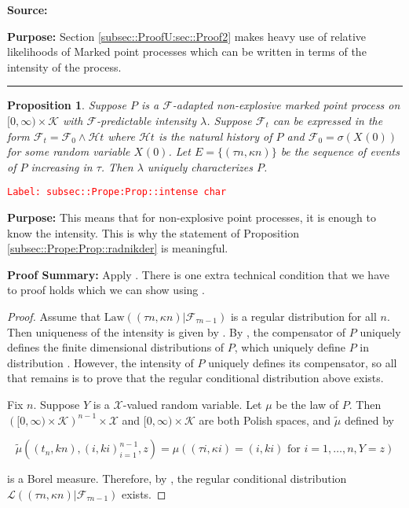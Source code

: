 \documentclass[12pt]{article}
\newcommand{\mc}{\mathcal}
\newcommand{\ms}{\mathscr}
\newcommand{\te}{\text}
\newcommand{\tr}{\textcolor{red}}
\newcommand{\labe}[1]{\tr{\texttt{Label: #1}}}
\newcommand{\purpose}{\textbf{Purpose: }}
\newcommand{\pfsum}{\textbf{Proof Summary: }}
\newcommand{\ind}{\hspace{24pt}}
\newcommand{\lin}{\rule{\linewidth}{0.4 pt}}
\renewcommand{\t}{t}							%
\newcommand{\F}{\mc{F}}							%
\newcommand{\FH}{\mc{H}}						%
\newcommand{\X}{X}								%
\newcommand{\cind}[1]{_{#1}}					%
\newcommand{\tp}[1]{(#1)}						%
\newcommand{\ts}[1]{_{#1}}						%
\newcommand{\rate}{\lambda}						%
\newcommand{\alt}[1]{\widetilde{#1}}			%
\newcommand{\indx}[1]{_{#1}}					%
\newcommand{\m}{\mu}							%
\newcommand{\law}{\te{Law}}						%
\newcommand{\XX}{Y}								%
\newcommand{\rt}{\tau}							%
\renewcommand{\mark}{\kappa}					%
\newcommand{\rp}{P}								%
\newcommand{\spce}{\mc{X}}						%
\newcommand{\xxx}{z}							%
\newcommand{\mspce}{\mc{K}}						%
\newtheorem{prop}[thms]{Proposition}
\begin{document}
\textbf{Source: }\cite[Definition 14.3.I]{DalVer08}

\purpose Section \ref{subsec::ProofU:sec::Proof2} makes heavy use of relative likelihoods of Marked point processes which can be written in terms of the intensity of the process.

\lin

\begin{prop}
Suppose \(\rp\) is a \(\F\)-adapted non-explosive marked point process on \([0,\infty)\times \mspce\) with \(\F\)-predictable intensity \(\rate\). Suppose \(\F\ts{\t}\) can be expressed in the form \(\F\ts{\t} = \F\ts{0}\wedge \FH{\t}\) where \(\FH{\t}\) is the natural history of \(\rp\) and \(\F\ts{0} = \sigma(\X\cind{}\tp{0})\) for some random variable \(\X\cind{}\tp{0}\). Let \(E = \{(\rt{n},\mark{n})\}\) be the sequence of events of \(\rp\) increasing in \(\rt\). Then \(\rate\) uniquely characterizes \(\rp\).
\label{subsec::Prope:Prop::intense char}
\end{prop}
\labe{subsec::Prope:Prop::intense char}

\purpose This means that for non-explosive point processes, it is enough to know the intensity. This is why the statement of Proposition \ref{subsec::Prope:Prop::radnikder} is meaningful.

\pfsum Apply \cite[Propositions 14.3.II(b),14.2.IV(c) and 9.2.III]{DalVer08}. There is one extra technical condition that we have to proof holds which we can show using \cite[Proposition A1.5.III]{DalVer03}.

\begin{proof}
Assume that \(\law((\rt{n},\mark{n})|\F\ts{\rt{n-1}})\) is a regular distribution for all \(n\). Then uniqueness of the intensity is given by \cite[Proposition 14.3.II (b)]{DalVer08}. By \cite[Proposition 14.2.IV (c)]{DalVer08}, the compensator of \(\rp\) uniquely defines the finite dimensional distributions of \(\rp\), which uniquely define \(\rp\) in distribution \cite[Proposition 9.2.III]{DalVer08}. However, the intensity of \(\rp\) uniquely defines its compensator, so all that remains is to prove that the regular conditional distribution above exists.

\ind Fix \(n\). Suppose \(\XX\) is a \(\spce\)-valued random variable. Let \(\m\) be the law of \(\rp\). Then \(\left([0,\infty)\times \mspce\right)^{n-1}\times\spce\) and \([0,\infty)\times \mspce\) are both Polish spaces, and \(\alt{\m}\) defined by 

\[\alt{\m}((\t\indx{n},k{n}),(	{i},k{i})_{i=1}^{n-1},\xxx) = \m\left((\rt{i},\mark{i}) = (	{i},k{i})\te{ for } i=1,\dots,n, \XX = \xxx\right)\]

is a Borel measure. Therefore, by \cite[Proposition A1.5.III]{DalVer03}, the regular conditional distribution \(\ms{L}((\rt{n},\mark{n})|\F\ts{\rt{n-1}})\) exists.
\end{proof}
\end{document}
